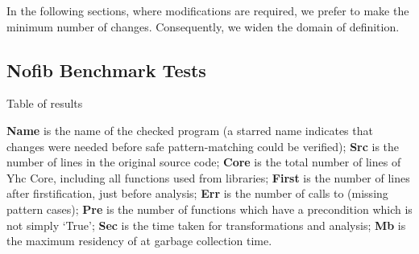 In the following sections, where modifications are required, we prefer to make the minimum number of changes. Consequently, we widen the domain of definition.

\subsection{Nofib Benchmark Tests}
\label{sec:imaginary}

\begin{table}
\caption{Table of results}
\label{tab:results}

\smallskip

\textbf{Name} is the name of the checked program (a starred name indicates that changes were needed before safe pattern-matching could be verified);
\textbf{Src} is the number of lines in the original source code;
\textbf{Core} is the total number of lines of Yhc Core, including all functions used from libraries;
\textbf{First} is the number of lines after firstification, just before analysis;
\textbf{Err} is the number of calls to  (missing pattern cases);
\textbf{Pre} is the number of functions which have a precondition which is not simply `True';
\textbf{Sec} is the time taken for transformations and analysis;
\textbf{Mb} is the maximum residency of \catch{} at garbage collection time.

\smallskip\smallskip


\end{table}
